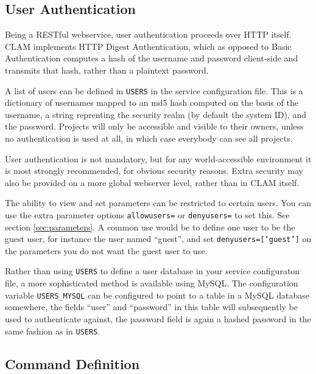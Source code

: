 \documentclass[a4paper,12pt]{report}
\begin{document}
\subsection{User Authentication}

Being a RESTful webservice, user authentication proceeds over HTTP itself. CLAM implements HTTP Digest Authentication, which as opposed to Basic Authentication computes a hash of the username and password client-side and transmits that hash, rather than a plaintext password. 

A list of users can be defined in \texttt{USERS} in the service configuration file. This is a dictionary of usernames mapped to an md5 hash computed on the basis of the username, a string reprenting the security realm (by default the system ID), and the password. Projects will only be accessible and visible to their owners, unless no authentication is used at all, in which case everybody can see all projects.



User authentication is not mandatory, but for any world-accessible environment it is most strongly recommended, for obvious security reasons. Extra security may also be provided on a more global webserver level, rather than in CLAM itself.

The ability to view and set parameters can be restricted to certain users. You can use the extra parameter options \texttt{allowusers=} or \texttt{denyusers=} to set this. See section \ref{sec:parameters}. A common use would be to define one user to be the guest user, for instance the user named ``guest'', and set \texttt{denyusers=['guest']} on the parameters you do not want the guest user to use.

Rather than using \texttt{USERS} to define a user database in your service configuraton file, a more sophisticated method is available using MySQL. The configuration variable \texttt{USERS\_MYSQL} can be configured to point to a table in a MySQL database somewhere, the fields ``user'' and ``password'' in this table will subsequently be used to authenticate against, the password field is again a hashed password in the same fashion as in \texttt{USERS}.


\subsection{Command Definition}
\label{sec:command}
\end{document}
